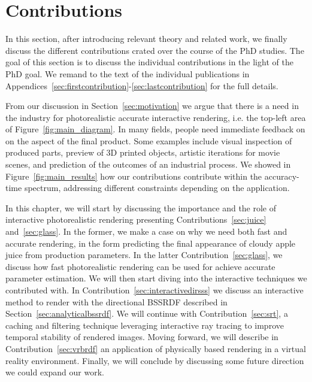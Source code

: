 \chapter{Contributions}
\label{sec:contributions}
In this section, after introducing relevant theory and related work, we finally discuss the different contributions crated over the course of the PhD studies. The goal of this section is to discuss the individual contributions in the light of the PhD goal. We remand to the text of the individual publications in Appendices~\ref{sec:firstcontribution}-\ref{sec:lastcontribution} for the full details.

From our discussion in Section~\ref{sec:motivation} we argue that there is a need in the industry for photorealistic accurate interactive rendering, i.e. the top-left area of Figure~\ref{fig:main_diagram}. In many fields, people need immediate feedback on on the aspect of the final product. Some examples include visual inspection of produced parts, preview of 3D printed objects, artistic iterations for movie scenes, and prediction of the outcomes of an industrial process. We showed in Figure~\ref{fig:main_results} how our contributions contribute within the accuracy-time spectrum, addressing different constraints depending on the application.

In this chapter, we will start by discussing the importance and the role of interactive photorealistic rendering presenting Contributions~\ref{sec:juice} and~\ref{sec:glass}. In the former, we make a case on why we need both fast and accurate rendering, in the form predicting the final appearance of cloudy apple juice from production parameters. In the latter Contribution~\ref{sec:glass}, we discuss how fast photorealistic rendering can be used for achieve accurate parameter estimation. We will then start diving into the interactive techniques we contributed with. In Contribution~\ref{sec:interactivedirsss} we discuss an interactive method to render with the directional BSSRDF described in Section~\ref{sec:analyticalbssrdf}. We will continue with Contribution~\ref{sec:srt}, a caching and filtering technique leveraging interactive ray tracing to improve temporal stability of rendered images. Moving forward, we will describe in Contribution~\ref{sec:vrbrdf} an application of physically based rendering in a virtual reality environment. Finally, we will conclude by discussing some future direction we could expand our work.

